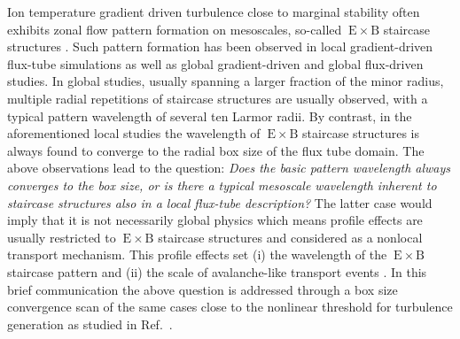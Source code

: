 \documentclass[aip, amsmath, amssymb, reprint, twocolumn]{revtex4-1}
\newcommand{\exb}{\mathrm{\:E}\times\mathrm{B}}
\begin{document}
Ion temperature gradient driven turbulence close to marginal stability often exhibits zonal flow pattern formation on mesoscales, so-called $\exb$ staircase structures \cite{pradalier2010}.
Such pattern formation has been observed in local gradient-driven flux-tube simulations \cite{peeters2016, weikl2017, rath2021} as well as global gradient-driven \cite{mcmillan2009, villard2013, seo2022} and global flux-driven \cite{pradalier2010, pradalier2015, wang2020, kim2022, kishimoto2023} studies. 
In global studies, usually spanning a larger fraction of the minor radius, multiple radial repetitions of staircase structures are usually observed, with a typical pattern wavelength of several ten Larmor radii.
By contrast, in the aforementioned local studies the wavelength of $\exb$ staircase structures is always found to converge to the radial box size of the flux tube domain.
The above observations lead to the question: 
\textit{Does the basic pattern wavelength always converges to the box size, or is there a typical mesoscale wavelength inherent to staircase structures also in a local flux-tube description?}
The latter case would imply that it is not necessarily global physics which means profile effects are usually restricted to $\exb$ staircase structures and considered as a nonlocal transport mechanism. This profile effects set (i) the wavelength of the $\exb$ staircase pattern and (ii) the scale of avalanche-like transport events \cite{pradalier2010}. 
In this brief communication the above question is addressed through a box size convergence scan of the same cases close to the nonlinear threshold for turbulence generation as studied in Ref.~\cite{peeters2016}.\bigskip

\end{document}
